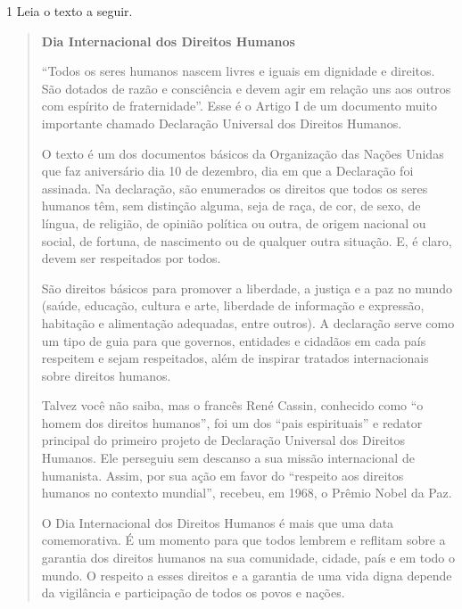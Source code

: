 \begin{escolha}
\begin{escolha}
\begin{escolha}
{

\num{1} Leia o texto a seguir.


\begin{quote}
\textbf{Dia Internacional dos Direitos Humanos}


``Todos os seres humanos nascem livres e iguais em dignidade e
direitos. São dotados de razão e consciência e devem agir em relação
uns aos outros com espírito de fraternidade''. Esse é o Artigo I de um
documento muito importante chamado Declaração Universal dos Direitos
Humanos.

O texto é um dos documentos básicos da Organização das Nações Unidas que
faz aniversário dia 10 de dezembro, dia em que a Declaração foi
assinada. Na declaração, são enumerados os direitos que todos os seres
humanos têm, sem distinção alguma, seja de raça, de cor, de sexo, de
língua, de religião, de opinião política ou outra, de origem nacional ou
social, de fortuna, de nascimento ou de qualquer outra situação. E, é
claro, devem ser respeitados por todos.

São direitos básicos para promover a liberdade, a justiça e a paz no
mundo (saúde, educação, cultura e arte, liberdade de informação e
expressão, habitação e alimentação adequadas, entre outros). A
declaração serve como um tipo de guia para que governos, entidades e
cidadãos em cada país respeitem e sejam respeitados, além de inspirar
tratados internacionais sobre direitos humanos.

Talvez você não saiba, mas o francês René Cassin, conhecido como ``o
homem dos direitos humanos'', foi um dos ``pais espirituais'' e redator
principal do primeiro projeto de Declaração Universal dos Direitos
Humanos. Ele perseguiu sem descanso a sua missão internacional de
humanista. Assim, por sua ação em favor do ``respeito aos direitos
humanos no contexto mundial'', recebeu, em 1968, o Prêmio Nobel da Paz.

O Dia Internacional dos Direitos Humanos é mais que uma data
comemorativa. É um momento para que todos lembrem e reflitam sobre a
garantia dos direitos humanos na sua comunidade, cidade, país e em todo
o mundo. O respeito a esses direitos e a garantia de uma vida digna
depende da vigilância e participação de todos os povos e nações.


\end{quote}}
\end{escolha}
\end{escolha}
\end{escolha}

